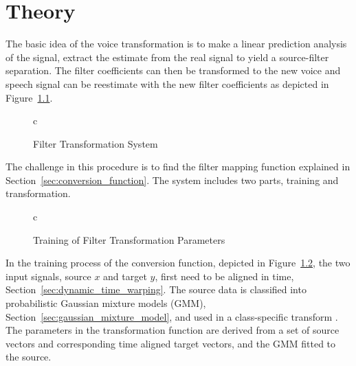 \chapter{Theory} %
\label{cha:theory}
The basic idea of the voice transformation is to make a linear prediction analysis of the signal, extract the estimate from the real signal to yield a source-filter separation. The filter coefficients can then be transformed to the new voice and speech signal can be reestimate with the new filter coefficients as depicted in Figure~\ref{fig:VC}.
\begin{figure}[htbp]
  \centering
   \begin{tabular}[h]{c}
  \end{tabular}
  \caption{Filter Transformation System}
  \label{fig:VC}
\end{figure}

The challenge in this procedure is to find the filter mapping function explained in Section~\ref{sec:conversion_function}. The system includes two parts, training and transformation. 
\begin{figure}[htbp]
	\centering
	\begin{tabular}[h]{c}
	\end{tabular}
	\caption{Training of Filter Transformation Parameters}
	\label{fig:VC_training}
\end{figure}
In the training process of the conversion function, depicted in Figure~\ref{fig:VC_training}, the two input signals, source $x$ and target $y$, first need to be aligned in time, Section~\ref{sec:dynamic_time_warping}. The source data is classified into probabilistic Gaussian mixture models (GMM), Section~\ref{sec:gaussian_mixture_model}, and used in a class-specific transform \cite{stylianou09}. The parameters in the transformation function are derived from a set of source vectors and corresponding time aligned target vectors, and the GMM fitted to the source.


